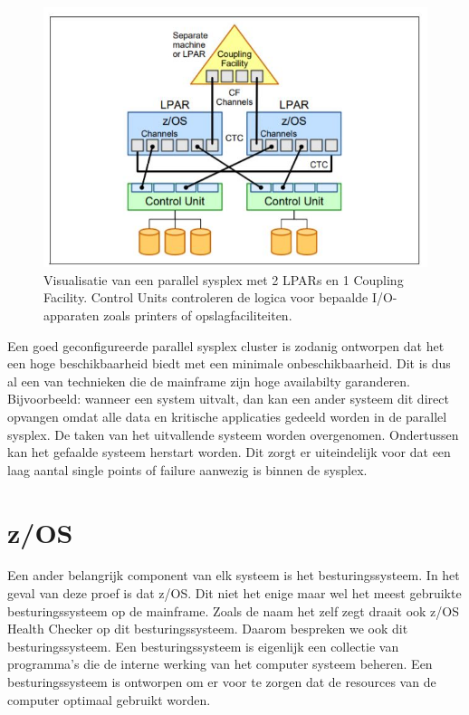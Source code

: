 \begin{figure}[h]
	\centering
	\includegraphics{img/ParallelSysplex}
	\caption[Visualisatie van een Parallel Sysplex]{Visualisatie van een parallel sysplex met 2 LPARs en 1 Coupling Facility. Control Units controleren de logica voor bepaalde I/O-apparaten zoals printers of opslagfaciliteiten.}
	\label{fig:parallelsysplex}
\end{figure}

Een goed geconfigureerde parallel sysplex cluster is zodanig ontworpen dat het een hoge beschikbaarheid biedt met een minimale onbeschikbaarheid. Dit is dus al een van technieken die de mainframe zijn hoge availabilty garanderen. Bijvoorbeeld: wanneer een system uitvalt, dan kan een ander systeem dit direct opvangen omdat alle data en kritische applicaties gedeeld worden in de parallel sysplex. De taken van het uitvallende systeem worden overgenomen. Ondertussen kan het gefaalde systeem herstart worden. Dit zorgt er uiteindelijk voor dat een laag aantal single points of failure aanwezig is binnen de sysplex. \cite{Ebbers2011}

\section{z/OS}
\label{subsec:z/OS}

Een ander belangrijk component van elk systeem is het besturingssysteem. In het geval van deze proef is dat z/OS. Dit niet het enige maar wel het meest gebruikte besturingssysteem op de mainframe. Zoals de naam het zelf zegt draait ook z/OS Health Checker op dit besturingssysteem. Daarom bespreken we ook dit besturingssysteem. Een besturingssysteem is eigenlijk een collectie van programma's die de interne werking van het computer systeem beheren. Een besturingssysteem is ontworpen om er voor te zorgen dat de resources van de computer optimaal gebruikt worden.

